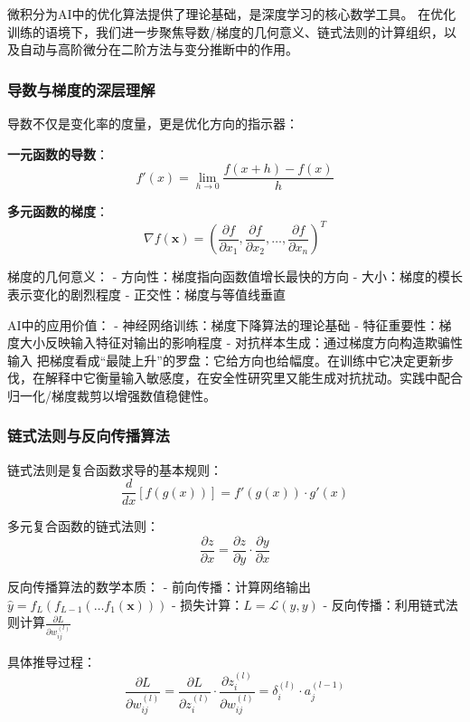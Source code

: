 微积分为AI中的优化算法提供了理论基础，是深度学习的核心数学工具。
在优化训练的语境下，我们进一步聚焦导数/梯度的几何意义、链式法则的计算组织，以及自动与高阶微分在二阶方法与变分推断中的作用。

\subsubsection{导数与梯度的深层理解}

导数不仅是变化率的度量，更是优化方向的指示器：

\textbf{一元函数的导数}：
$$f'(x) = \lim_{h \to 0} \frac{f(x+h) - f(x)}{h}$$

\textbf{多元函数的梯度}：
$$\nabla f(\mathbf{x}) = \left(\frac{\partial f}{\partial x_1}, \frac{\partial f}{\partial x_2}, \ldots, \frac{\partial f}{\partial x_n}\right)^T$$

梯度的几何意义：
- 方向性：梯度指向函数值增长最快的方向
- 大小：梯度的模长表示变化的剧烈程度
- 正交性：梯度与等值线垂直

AI中的应用价值：
- 神经网络训练：梯度下降算法的理论基础
- 特征重要性：梯度大小反映输入特征对输出的影响程度
- 对抗样本生成：通过梯度方向构造欺骗性输入
把梯度看成“最陡上升”的罗盘：它给方向也给幅度。在训练中它决定更新步伐，在解释中它衡量输入敏感度，在安全性研究里又能生成对抗扰动。实践中配合归一化/梯度裁剪以增强数值稳健性。

\subsubsection{链式法则与反向传播算法}

链式法则是复合函数求导的基本规则：
$$\frac{d}{dx}[f(g(x))] = f'(g(x)) \cdot g'(x)$$

多元复合函数的链式法则：
$$\frac{\partial z}{\partial x} = \frac{\partial z}{\partial y} \cdot \frac{\partial y}{\partial x}$$

反向传播算法的数学本质：
- 前向传播：计算网络输出$\hat{y} = f_L(f_{L-1}(\ldots f_1(\mathbf{x})))$
- 损失计算：$L = \mathcal{L}(\hat{y}, y)$
- 反向传播：利用链式法则计算$\frac{\partial L}{\partial w_{ij}^{(l)}}$

具体推导过程：
$$\frac{\partial L}{\partial w_{ij}^{(l)}} = \frac{\partial L}{\partial z_i^{(l)}} \cdot \frac{\partial z_i^{(l)}}{\partial w_{ij}^{(l)}} = \delta_i^{(l)} \cdot a_j^{(l-1)}$$

